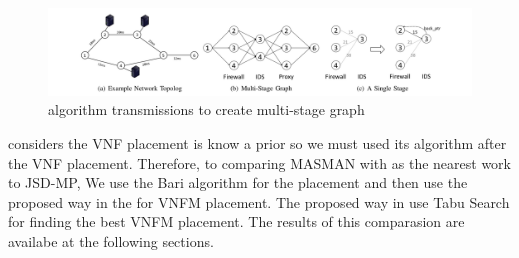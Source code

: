 \begin{figure}[h!]
  \centering
  \includegraphics[width=\textwidth]{images/bari.png}
  \caption{\cite{Bari2015} algorithm transmissions to create multi-stage graph}
\end{figure}

\cite{AbuLebdeh2017} considers the VNF placement is know a prior so we must used its algorithm after the VNF placement.
Therefore, to comparing MASMAN with \cite{AbuLebdeh2017} as the nearest work to JSD-MP,
We use the Bari \cite{Bari2015} algorithm for the placement and then use the proposed way in the \cite{AbuLebdeh2017} for VNFM placement.
The proposed way in \cite{AbuLebdeh2017} use Tabu Search for finding the best VNFM placement.
The results of this comparasion are availabe at the following sections.

